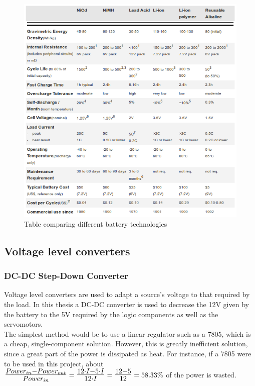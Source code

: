 		\begin{figure}[H]
				\centering
				\includegraphics[scale=0.75]{images/ProjectComponents/battery-differences.png}
				\caption{Table comparing different battery technologies}
				\label{}
		\end{figure}
		\bigskip

\newpage
\subsection{Voltage level converters}	
	\subsubsection{DC-DC Step-Down Converter}

		Voltage level converters are used to adapt a source's voltage to that required by the load. In this thesis a DC-DC converter is used to decrease the 12V given by the battery to the 5V required by the logic components as well as the servomotors. \\
		
		The simplest method would be to use a linear regulator such as a 7805, which is a cheap, single-component solution. However, this is greatly inefficient solution, since a great part of the power is dissipated as heat.
		For instance, if a 7805 were to be used in this project, about $\mbox{\Large $\frac{Power_{in} - Power_{out} }{Power_{in} }$}=\mbox{\Large $\frac{12 \cdot I -5 \cdot I}{12\cdot I}$}=\mbox{\Large $\frac{12-5}{12}$}=58.33\%$ of the power is wasted.\\


